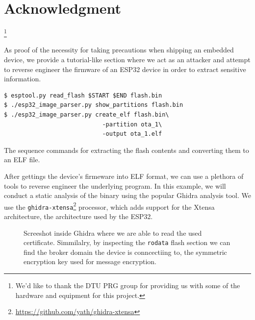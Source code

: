 \documentclass[conference]{IEEEtran}
\begin{document}
\section*{Acknowledgment}

\thanks{We'd like to thank the DTU PRG group for providing us with some of the hardware and equipment for this project.}




\appendices
{}

\label{appendix:reverse_engineering}

As proof of the necessity for taking precautions when shipping an embedded device, 
we provide a tutorial-like section where we act as an attacker and attempt to reverse engineer the firmware of an ESP32
device in order to extract sensitive information.

\begin{listing}[h]
\begin{verbatim}
$ esptool.py read_flash $START $END flash.bin
$ ./esp32_image_parser.py show_partitions flash.bin
$ ./esp32_image_parser.py create_elf flash.bin\
                            -partition ota_1\
                            -output ota_1.elf
\end{verbatim}
\caption{The sequence commands for extracting the flash contents and converting them to an ELF file.}
\end{listing}

After gettings the device's firmeware into ELF format, we can use a plethora of tools 
to reverse engineer the underlying program. 
In this example, we will conduct a static analysis of the binary using the popular Ghidra\cite{Ghidra,GhidraBook} analysis tool.
We use the \texttt{ghidra-xtensa}\footnote{\url{https://github.com/yath/ghidra-xtensa}} processor,
which adds support for the Xtensa architecture, the architecture used by the ESP32.

\begin{figure}[h]
    \centering
    \caption{Screeshot inside Ghidra where we are able to read the used certificate. Simmilalry, 
    by inspecting the \texttt{rodata} flash section we can find the broker domain the device is conncectiing to, the 
    symmetric encryption key used for message encryption.}
    \label{fig:ghidra}
\end{figure}
\end{document}
